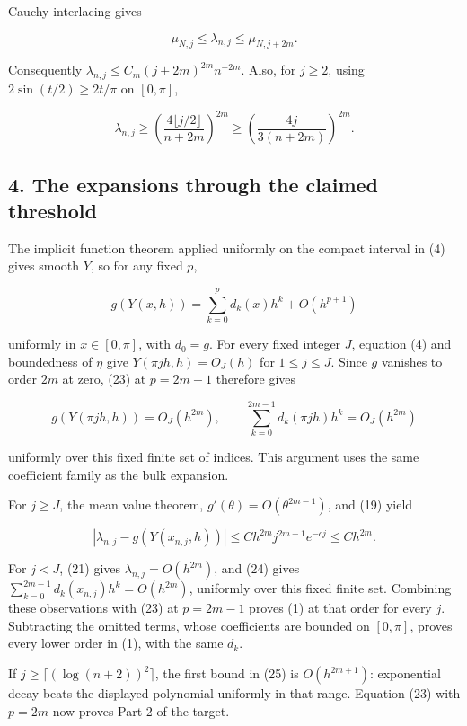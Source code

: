\documentclass[10pt,a4paper]{article}
\begin{document}
Cauchy interlacing gives

\nopagebreak[3]
\[
\mu_{N,j}\le\lambda_{n,j}\le\mu_{N,j+2m}.
\tag{21}
\]

Consequently \(\lambda_{n,j}\le C_m(j+2m)^{2m}n^{-2m}\). Also, for \(j\ge2\), using \(2\sin(t/2)\ge2t/\pi\) on \([0,\pi]\),

\nopagebreak[3]
\[
\lambda_{n,j}\ge\left(\frac{4\lfloor j/2\rfloor}{n+2m}\right)^{2m}
\ge\left(\frac{4j}{3(n+2m)}\right)^{2m}.
\tag{22}
\]

\subsection{4. The expansions through the claimed threshold}\label{the-expansions-through-the-claimed-threshold}

The implicit function theorem applied uniformly on the compact interval in (4) gives smooth \(Y\), so for any fixed \(p\),

\nopagebreak[3]
\[
g(Y(x,h))=\sum_{k=0}^p d_k(x)h^k+O(h^{p+1})
\tag{23}
\]

uniformly in \(x\in[0,\pi]\), with \(d_0=g\). For every fixed integer \(J\), equation (4) and boundedness of \(\eta\) give \(Y(\pi jh,h)=O_J(h)\) for \(1\le j\le J\). Since \(g\) vanishes to order \(2m\) at zero, (23) at \(p=2m-1\) therefore gives

\nopagebreak[3]
\[
g(Y(\pi jh,h))=O_J(h^{2m}),\qquad
\sum_{k=0}^{2m-1}d_k(\pi jh)h^k=O_J(h^{2m})
\tag{24}
\]

uniformly over this fixed finite set of indices. This argument uses the same coefficient family as the bulk expansion.

For \(j\ge J\), the mean value theorem, \(g'(\theta)=O(\theta^{2m-1})\), and (19) yield

\nopagebreak[3]
\[
|\lambda_{n,j}-g(Y(x_{n,j},h))|
\le C h^{2m}j^{2m-1}e^{-cj}\le C h^{2m}.
\tag{25}
\]

For \(j<J\), (21) gives \(\lambda_{n,j}=O(h^{2m})\), and (24) gives \(\sum_{k=0}^{2m-1}d_k(x_{n,j})h^k=O(h^{2m})\), uniformly over this fixed finite set. Combining these observations with (23) at \(p=2m-1\) proves (1) at that order for every \(j\). Subtracting the omitted terms, whose coefficients are bounded on \([0,\pi]\), proves every lower order in (1), with the same \(d_k\).

If \(j\ge\lceil(\log(n+2))^2\rceil\), the first bound in (25) is \(O(h^{2m+1})\): exponential decay beats the displayed polynomial uniformly in that range. Equation (23) with \(p=2m\) now proves Part 2 of the target.
\end{document}
